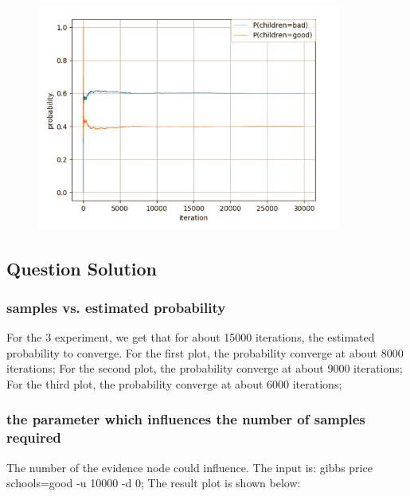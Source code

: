 \documentclass[11pt, a4paper]{article}
\begin{document}
\begin{figure}[htbp]
	
	\centering 
	\includegraphics[width=10cm]{gs_10}
	
	\label{fig:gb10}
	
\end{figure}

\subsection{Question Solution}

\subsubsection{samples vs. estimated probability}

For the 3 experiment, we get that for about 15000 iterations, the estimated probability to converge.
For the first plot, the probability converge at about 8000 iterations;
For the second plot, the probability converge at about 9000 iterations;
For the third plot, the probability converge at about 6000 iterations;


\subsubsection{the parameter which influences the number of samples required}


The number of the evidence node could influence.
The input is: gibbs price schools=good -u 10000 -d 0; The result plot is shown below: 
\end{document}
